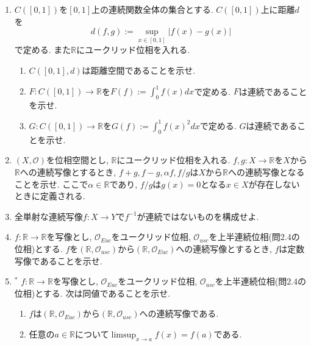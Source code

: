 \documentclass[dvipdfmx,a4paper,11pt]{article}
\newcommand{\R}{\mathbb{R}}
\theoremstyle{definition}
\begin{document}
\begin{enumerate}[ label=\textbf{問}3.\arabic*]
\item $C([0,1])$を$[0,1]$上の連続関数全体の集合とする. $C([0,1])$上に距離$d$を
$$
d(f,g) := \sup_{x \in [0,1]} | f(x) - g(x)|
$$
で定める. また$\R$にユークリッド位相を入れる.
	\begin{enumerate}
	\item $C([0,1], d)$は距離空間であることを示せ.
	\item $F : C([0,1]) \rightarrow \R$を$F(f) := \int_{0}^{1} f(x) dx$で定める. $F$は連続であることを示せ.
	\item $G : C([0,1]) \rightarrow \R$を$G(f) := \int_{0}^{1} f(x)^2 dx$で定める. $G$は連続であることを示せ.
	\end{enumerate}

\item $(X, \mathscr{O})$を位相空間とし, $\R$にユークリッド位相を入れる. $f,g :  X \rightarrow \R$を$X$から$\R$への連続写像とするとき, $f +g, f-g, \alpha f, f/g$は$X$から$\R$への連続写像となることを示せ. ここで$\alpha \in \R$であり, $f/g$は$g(x)=0$となる$x \in X$が存在しないときに定義される. 



 \item 全単射な連続写像$f :  X \rightarrow Y$で$f^{-1}$が連続ではないものを構成せよ. 
 
	

\item $f : \R \rightarrow \R$を写像とし, $\mathscr{O}_{Euc}$をユークリッド位相, $\mathscr{O}_{usc}$を上半連続位相(問2.4の位相)とする. $f$を$(\R, \mathscr{O}_{usc})$から$(\R, \mathscr{O}_{Euc})$への連続写像とするとき, $f$は定数写像であることを示せ.

\item $^*$ $f : \R \rightarrow \R$を写像とし, $\mathscr{O}_{Euc}$をユークリッド位相, $\mathscr{O}_{usc}$を上半連続位相(問2.4の位相)とする. 次は同値であることを示せ.
	\begin{enumerate}
	\item $f$は$(\R, \mathscr{O}_{Euc})$から$(\R, \mathscr{O}_{usc})$への連続写像である.
	\item 任意の$a \in \R$について$\limsup_{x \rightarrow a} f(x) =f(a)$である.
	\end{enumerate}
 

\end{enumerate}
\end{document}
